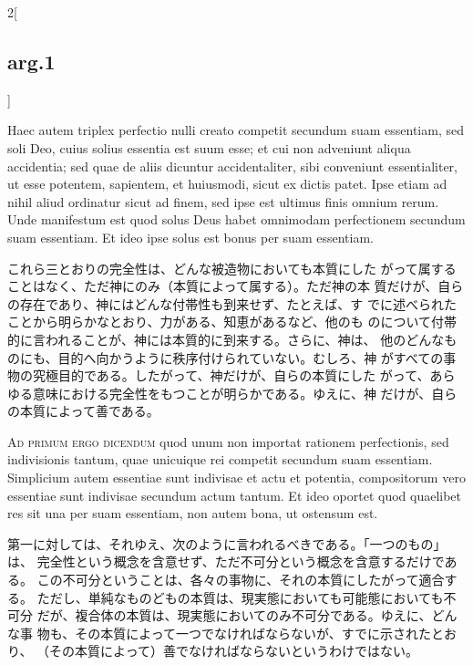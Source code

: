 \documentclass[paper=a4paper,fontsize=10pt,jafontsize=9pt,titlepage]{jlreq}
\begin{document}
\begin{paracol}{2}[\subsection{arg.1}]
\switchcolumn*

Haec
autem triplex perfectio nulli creato competit secundum suam essentiam,
sed soli Deo, cuius solius essentia est suum esse; et cui non adveniunt
aliqua accidentia; sed quae de aliis dicuntur accidentaliter, sibi
conveniunt essentialiter, ut esse potentem, sapientem, et huiusmodi,
sicut ex dictis patet. Ipse etiam ad nihil aliud ordinatur sicut ad
finem, sed ipse est ultimus finis omnium rerum. Unde manifestum est quod
solus Deus habet omnimodam perfectionem secundum suam essentiam. Et ideo
ipse solus est bonus per suam essentiam.

\switchcolumn

これら三とおりの完全性は、どんな被造物においても本質にした
 がって属することはなく、ただ神にのみ（本質によって属する）。ただ神の本
 質だけが、自らの存在であり、神にはどんな付帯性も到来せず、たとえば、す
 でに述べられたことから明らかなとおり、力がある、知恵があるなど、他のも
 のについて付帯的に言われることが、神には本質的に到来する。さらに、神は、
 他のどんなものにも、目的へ向かうように秩序付けられていない。むしろ、神
 がすべての事物の究極目的である。したがって、神だけが、自らの本質にした
 がって、あらゆる意味における完全性をもつことが明らかである。ゆえに、神
 だけが、自らの本質によって善である。

\switchcolumn*[\subsection{ad.1}]

{\scshape Ad primum ergo dicendum} quod unum non importat rationem perfectionis,
sed indivisionis tantum, quae unicuique rei competit secundum suam
essentiam. Simplicium autem essentiae sunt indivisae et actu et
potentia, compositorum vero essentiae sunt indivisae secundum actum
tantum. Et ideo oportet quod quaelibet res sit una per suam essentiam,
non autem bona, ut ostensum est.

\switchcolumn

第一に対しては、それゆえ、次のように言われるべきである。「一つのもの」は、
 完全性という概念を含意せず、ただ不可分という概念を含意するだけである。
 この不可分ということは、各々の事物に、それの本質にしたがって適合する。
 ただし、単純なものどもの本質は、現実態においても可能態においても不可分
 だが、複合体の本質は、現実態においてのみ不可分である。ゆえに、どんな事
 物も、その本質によって一つでなければならないが、すでに示されたとおり、
 （その本質によって）善でなければならないというわけではない。

\switchcolumn*[\subsection{ad.2}]


\end{paracol}
\end{document}
